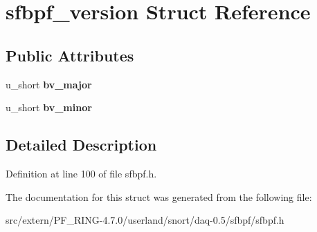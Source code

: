 \hypertarget{structsfbpf__version}{
\section{sfbpf\_\-version Struct Reference}
\label{structsfbpf__version}
}
\subsection*{Public Attributes}
\begin{DoxyCompactItemize}
\item 
\hypertarget{structsfbpf__version_a4ee555250b56a1042defd277aa9a3f5e}{
u\_\-short {\bfseries bv\_\-major}}
\label{structsfbpf__version_a4ee555250b56a1042defd277aa9a3f5e}

\item 
\hypertarget{structsfbpf__version_a4a2ae1b163db44d92c9c32d75d609d3c}{
u\_\-short {\bfseries bv\_\-minor}}
\label{structsfbpf__version_a4a2ae1b163db44d92c9c32d75d609d3c}

\end{DoxyCompactItemize}


\subsection{Detailed Description}


Definition at line 100 of file sfbpf.h.



The documentation for this struct was generated from the following file:\begin{DoxyCompactItemize}
\item 
src/extern/PF\_\-RING-\/4.7.0/userland/snort/daq-\/0.5/sfbpf/sfbpf.h\end{DoxyCompactItemize}
